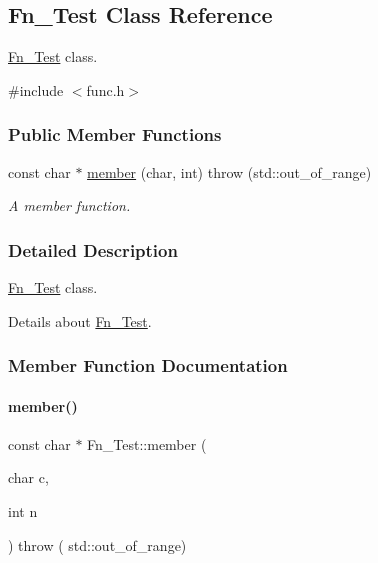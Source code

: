 \hypertarget{class_fn___test}{}\subsection{Fn\+\_\+\+Test Class Reference}
\label{class_fn___test}


\mbox{\hyperlink{class_fn___test}{Fn\+\_\+\+Test}} class.  




{\ttfamily \#include $<$func.\+h$>$}

\subsubsection*{Public Member Functions}
\begin{DoxyCompactItemize}
\item 
const char $\ast$ \mbox{\hyperlink{class_fn___test_a823b5c9726bb8f6ece50e57ac8e3092c}{member}} (char, int)  throw (std\+::out\+\_\+of\+\_\+range)
\begin{DoxyCompactList}\small\item\em A member function. \end{DoxyCompactList}\end{DoxyCompactItemize}


\subsubsection{Detailed Description}
\mbox{\hyperlink{class_fn___test}{Fn\+\_\+\+Test}} class. 

Details about \mbox{\hyperlink{class_fn___test}{Fn\+\_\+\+Test}}. 

\subsubsection{Member Function Documentation}
\mbox{\label{class_fn___test_a823b5c9726bb8f6ece50e57ac8e3092c}} 
\paragraph{\texorpdfstring{member()}{member()}}
{\footnotesize\ttfamily const char $\ast$ Fn\+\_\+\+Test\+::member (\begin{DoxyParamCaption}\item[{char}]{c,  }\item[{int}]{n }\end{DoxyParamCaption}) throw ( std\+::out\+\_\+of\+\_\+range) }



